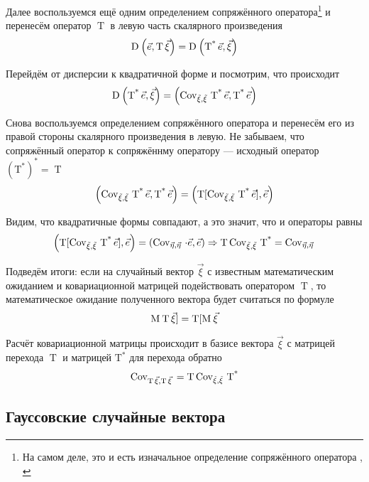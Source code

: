 Далее воспользуемся ещё одним определением сопряжённого оператора\footnote{На
самом деле, это и есть изначальное определение сопряжённого оператора
\cite[с.~241]{VoevodinLA}, \cite[с.~126]{IlinPoznyarLA}}
и перенесём оператор $\operatorname{T}$ в левую часть скалярного произведения
$$\operatorname{D}_{} \left( \vec{e}, \operatorname{T} \vec{\xi} \right)
    = \operatorname{D}_{} \left( \operatorname{T^*} \vec{e} , \vec{\xi} \right)$$

Перейдём от дисперсии к квадратичной форме и посмотрим, что происходит
$$\operatorname{D}_{} \left( \operatorname{T^*} \vec{e} , \vec{\xi} \right)
    = \left( \operatorname{\operatorname{Cov}_{\vec{\xi}, \vec{\xi}}\,} \operatorname{T^*} \vec{e} ,
        \operatorname{T^*} \vec{e} \right)$$

Снова воспользуемся определением сопряжённого оператора и перенесём его
из правой стороны скалярного произведения в левую. Не забываем, что
сопряжённый оператор к сопряжённму оператору --- исходный оператор
$\left( \operatorname{T^*} \right)^* = \operatorname{T}$
$$\left( \operatorname{\operatorname{Cov}_{\vec{\xi}, \vec{\xi}}\,} \operatorname{T^*} \vec{e} ,
        \operatorname{T^*} \vec{e} \right)
    = \left( \operatorname{T}[
            \operatorname{\operatorname{Cov}_{\vec{\xi}, \vec{\xi}}\,} \operatorname{T^*} \vec{e}] ,
        \vec{e} \right)$$

Видим, что квадратичные формы совпадают, а это значит, что и операторы равны
$$\left( \operatorname{T}[
    \operatorname{\operatorname{Cov}_{\vec{\xi}, \vec{\xi}}\,} \operatorname{T^*} \vec{e}] , \vec{e} \right)
        = \left( \operatorname{Cov}_{\vec{\eta}, \vec{\eta}}\, \cdot \vec{e}, \vec{e} \right)
    \Rightarrow
    \operatorname{T} \operatorname{\operatorname{Cov}_{\vec{\xi}, \vec{\xi}}\,} \operatorname{T^*} 
        = \operatorname{Cov}_{\vec{\eta}, \vec{\eta}}\,$$

Подведём итоги: если на случайный вектор $\vec{\xi}$ с известным математическим
ожиданием и ковариационной матрицей подействовать оператором $\operatorname{T}$,
то математическое ожидание полученного вектора будет считаться по формуле
$$\operatorname{M}_{} \operatorname{T} \vec{\xi}] = \operatorname{T}[\operatorname{M}_{} \vec{\xi} $$

Расчёт ковариационной матрицы происходит в базисе вектора $\vec{\xi}$
с матрицей перехода $\operatorname{T}$ и матрицей $\operatorname{T^*}$
для перехода обратно
$$\operatorname{Cov}_{\operatorname{T} \vec{\xi} , \operatorname{T} \vec{\xi} }\,
    = \operatorname{T} \operatorname{\operatorname{Cov}_{\vec{\xi}, \vec{\xi}}\,} \operatorname{T^*} $$

\subsection{Гауссовские случайные вектора}


